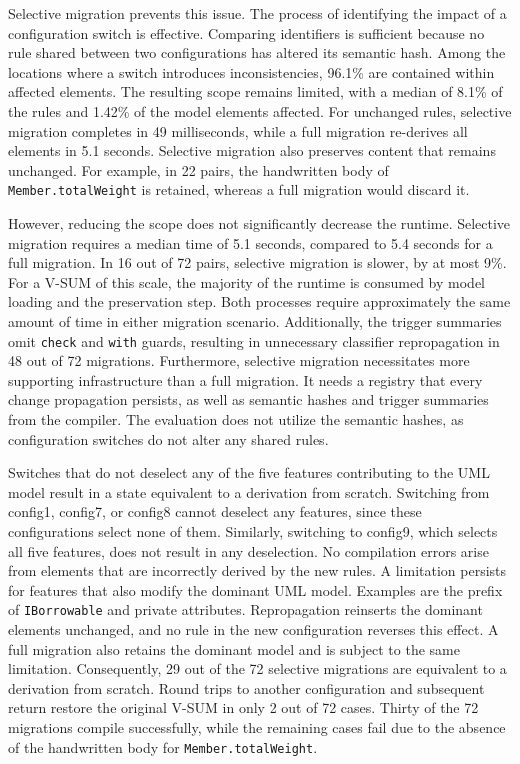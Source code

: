 Selective migration prevents this issue.
The process of identifying the impact of a configuration switch is effective.
Comparing identifiers is sufficient because no rule shared between two configurations has altered its semantic hash.
Among the locations where a switch introduces inconsistencies, 96.1\% are contained within affected elements.
The resulting scope remains limited, with a median of 8.1\% of the rules and 1.42\% of the model elements affected.
For unchanged rules, selective migration completes in 49 milliseconds, while a full migration re-derives all elements in 5.1 seconds.
Selective migration also preserves content that remains unchanged.
For example, in 22 pairs, the handwritten body of \texttt{Member.totalWeight} is retained, whereas a full migration would discard it.

However, reducing the scope does not significantly decrease the runtime.
Selective migration requires a median time of 5.1 seconds, compared to 5.4 seconds for a full migration.
In 16 out of 72 pairs, selective migration is slower, by at most 9\%.
For a V-SUM of this scale, the majority of the runtime is consumed by model loading and the preservation step.
Both processes require approximately the same amount of time in either migration scenario.
Additionally, the trigger summaries omit \texttt{check} and \texttt{with} guards, resulting in unnecessary classifier repropagation in 48 out of 72 migrations.
Furthermore, selective migration necessitates more supporting infrastructure than a full migration.
It needs a registry that every change propagation persists, as well as semantic hashes and trigger summaries from the compiler.
The evaluation does not utilize the semantic hashes, as configuration switches do not alter any shared rules.

Switches that do not deselect any of the five features contributing to the UML model result in a state equivalent to a derivation from scratch.
Switching from config1, config7, or config8 cannot deselect any features, since these configurations select none of them.
Similarly, switching to config9, which selects all five features, does not result in any deselection.
No compilation errors arise from elements that are incorrectly derived by the new rules.
A limitation persists for features that also modify the dominant UML model.
Examples are the prefix of \texttt{IBorrowable} and private attributes.
Repropagation reinserts the dominant elements unchanged, and no rule in the new configuration reverses this effect.
A full migration also retains the dominant model and is subject to the same limitation.
Consequently, 29 out of the 72 selective migrations are equivalent to a derivation from scratch.
Round trips to another configuration and subsequent return restore the original V-SUM in only 2 out of 72 cases.
Thirty of the 72 migrations compile successfully, while the remaining cases fail due to the absence of the handwritten body for \texttt{Member.totalWeight}.

